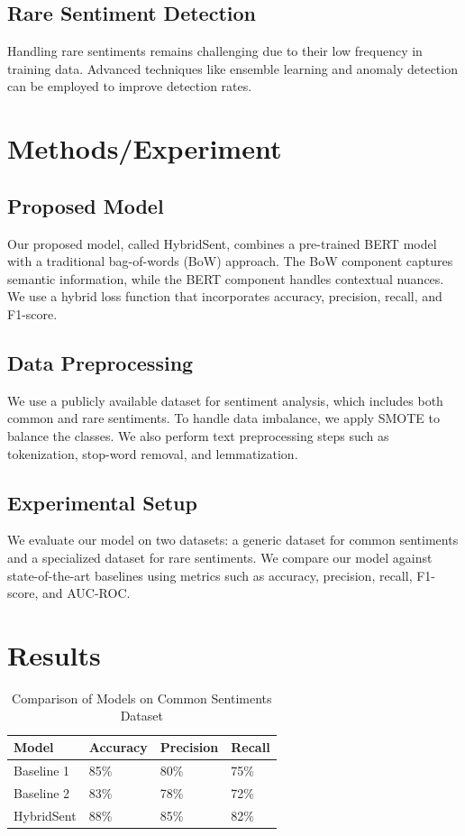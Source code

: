 \documentclass{article}
\begin{document}
\subsection{Rare Sentiment Detection}
Handling rare sentiments remains challenging due to their low frequency in training data. Advanced techniques like ensemble learning and anomaly detection can be employed to improve detection rates.

\section{Methods/Experiment}
\subsection{Proposed Model}
Our proposed model, called HybridSent, combines a pre-trained BERT model with a traditional bag-of-words (BoW) approach. The BoW component captures semantic information, while the BERT component handles contextual nuances. We use a hybrid loss function that incorporates accuracy, precision, recall, and F1-score.

\subsection{Data Preprocessing}
We use a publicly available dataset for sentiment analysis, which includes both common and rare sentiments. To handle data imbalance, we apply SMOTE to balance the classes. We also perform text preprocessing steps such as tokenization, stop-word removal, and lemmatization.

\subsection{Experimental Setup}
We evaluate our model on two datasets: a generic dataset for common sentiments and a specialized dataset for rare sentiments. We compare our model against state-of-the-art baselines using metrics such as accuracy, precision, recall, F1-score, and AUC-ROC.

\section{Results}
\begin{table}[ht]
    \centering
    \begin{tabularx}{\textwidth}{|X|X|X|X|}
        \hline
        \textbf{Model} & \textbf{Accuracy} & \textbf{Precision} & \textbf{Recall} \\
        \hline
        Baseline 1 & 85\% & 80\% & 75\% \\
        Baseline 2 & 83\% & 78\% & 72\% \\
        HybridSent & 88\% & 85\% & 82\% \\
        \hline
    \end{tabularx}
    \caption{Comparison of Models on Common Sentiments Dataset}
    \label{tab:common_sentiments}
\end{table}
\end{document}
